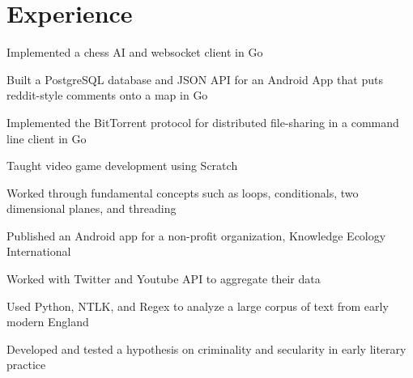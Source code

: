 \documentclass[]{deedy-resume-openfont}
\begin{document}

\section{Experience}
\begin{tightemize}
\item Implemented a chess AI and websocket client in Go
\item Built a PostgreSQL database and JSON API for an Android App that puts reddit-style comments onto a map in Go
\item Implemented the BitTorrent protocol for distributed file-sharing in a command line client in Go
\end{tightemize}
\sectionsep

\begin{tightemize}
\item Taught video game development using Scratch
\item Worked through fundamental concepts such as loops, conditionals, two dimensional planes, and threading
\end{tightemize}
\sectionsep

\begin{tightemize}
\item Published an Android app for a non-profit organization, Knowledge Ecology International
\item Worked with Twitter and Youtube API to aggregate their data
\end{tightemize}
\sectionsep


\begin{tightemize}
\item Used Python, NTLK, and Regex to analyze a large corpus of text from early modern England
\item Developed and tested a hypothesis on criminality and secularity in early literary practice
\end{tightemize}
\sectionsep
\end{document}
